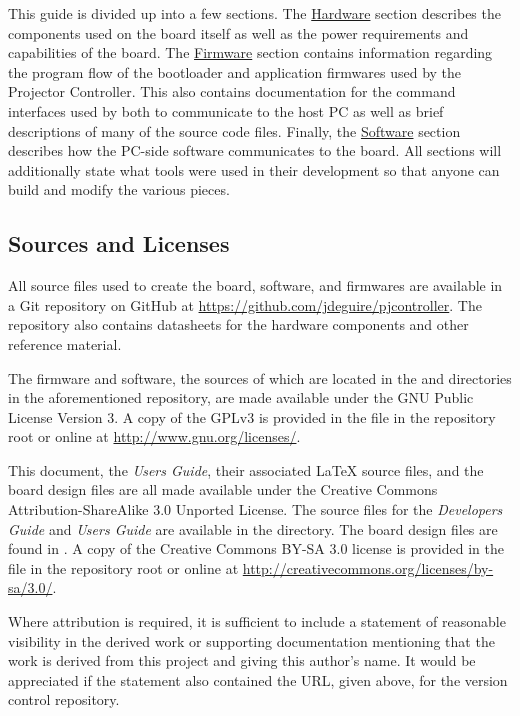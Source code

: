 \documentclass{article}
\begin{document}
This guide is divided up into a few sections.  The \hyperref[sec:Hardware]{Hardware} section
describes the components used on the board itself as well as the power requirements and capabilities
of the board.  The \hyperref[sec:Firmware]{Firmware} section contains information regarding the
program flow of the bootloader and application firmwares used by the Projector Controller.  This
also contains documentation for the command interfaces used by both to communicate to the host PC as
well as brief descriptions of many of the source code files.  Finally, the
\hyperref[sec:Software]{Software} section describes how the PC-side software communicates to the
board.  All sections will additionally state what tools were used in their development so that
anyone can build and modify the various pieces.

\subsection{Sources and Licenses} \label{ssec:SourceLic}
All source files used to create the board, software, and firmwares are available in a Git repository
on GitHub at \url{https://github.com/jdeguire/pjcontroller}.  The repository also contains
datasheets for the hardware components and other reference material.

The firmware and software, the sources of which are located in the  and
 directories in the aforementioned repository, are made available under the GNU
Public License Version 3.  A copy of the GPLv3 is provided in the file  in the
repository root or online at \url{http://www.gnu.org/licenses/}.

This document, the \textit{Users Guide}, their associated \LaTeX{} source files, and the board
design files are all made available under the Creative Commons Attribution-ShareAlike 3.0 Unported
License.  The source files for the \textit{Developers Guide} and \textit{Users Guide} are available
in the  directory.  The board design files are found in
.  A copy of the Creative Commons BY-SA 3.0 license is provided in the
file  in the repository root or online at
\url{http://creativecommons.org/licenses/by-sa/3.0/}.

Where attribution is required, it is sufficient to include a statement of reasonable visibility in
the derived work or supporting documentation mentioning that the work is derived from this project
and giving this author's name.  It would be appreciated if the statement also contained the URL,
given above, for the version control repository.
\end{document}
